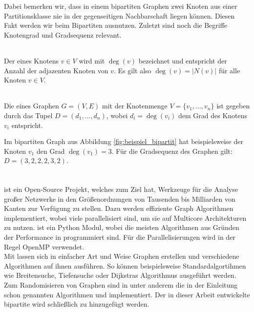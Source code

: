 Dabei bemerken wir, dass in einem bipartiten Graphen zwei Knoten aus einer Partitionsklasse nie
in der gegenseitigen Nachbarschaft liegen können. Diesen Fakt werden wir beim Bipartiten \gc{} ausnutzen.
Zuletzt sind noch die Begriffe Knotengrad und Gradsequenz relevant.
\begin{definition}[Knotengrad]~\\
Der  eines Knotens $v \in V$ wird mit $\deg(v)$ bezeichnet und entspricht der Anzahl
der adjazenten Knoten von $v$. Es gilt also $\deg(v) = |N(v)|$ für alle Knoten $v\in V.$
\end{definition}
\begin{definition}[Gradsequenz]~\\
Die  eines Graphen $G = (V,E)$ mit der Knotenmenge $V = \{v_{1},\dots, v_{n}\}$ ist gegeben durch das Tupel
$D = (d_{1}, \dots, d_{n})$, wobei $d_{i} = \deg(v_{i})$ dem Grad des Knotens $v_{i}$ entspricht.
\end{definition}

Im bipartiten Graph aus Abbildung \ref{fig:beispiel_bipartit} hat beispielsweise
der Knoten $v_{1}$ den Grad $\deg(v_{1}) = 3$. Für die Gradsequenz des Graphen gilt: 
$D = (3,2,2,2,3,2)$.




\section{\nk}

\nk{} \cite{nk} ist ein Open-Source Projekt, welches  zum Ziel hat, Werkzeuge für die
Analyse großer Netzwerke in den Größenordnungen von Tausenden bis Milliarden 
von Kanten zur Verfügung zu stellen.
Dazu werden effiziente Graph Algorithmen implementiert, wobei viele parallelisiert
sind, um sie auf Multicore Architekturen zu nutzen\cite{nk_page}.
\nk{} ist ein Python Modul, wobei die meisten Algorithmen aus Gründen
der Performance in \cpp programmiert sind. Für die Parallelisierungen wird in der Regel OpenMP\cite{openmp} verwendet.
\\

Mit \nk{} lassen sich in einfacher Art und Weise Graphen erstellen  und verschiedene
Algorithmen auf ihnen ausführen. So können beispielsweise Standardalgortihmen
wie Breitensuche, Tiefensuche oder Dijkstras Algorithmus ausgeführt werden. 
Zum Randomisieren von Graphen sind in \nk{} unter anderem die in der Einleitung schon genannten 
Algorithmen \cb{} und \gc{} implementiert.
Der in dieser Arbeit entwickelte bipartite \gc{} wird schließlich zu \nk{} hinzugefügt werden.


